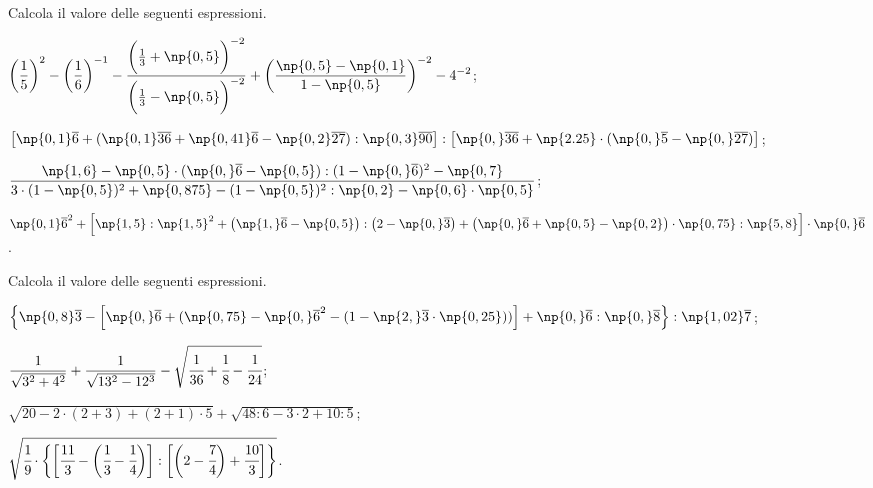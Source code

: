 \begin{esercizio}[\Ast]
 Calcola il valore delle seguenti espressioni.
\begin{enumeratea}
\spazielenx
\item $\displaystyle{\bigg(\frac{1}{5}\bigg)^{2}-\bigg(\frac{1}{6}\bigg)^{-1}-\frac{\bigg(\frac{1}{3}+\np{0,5}\bigg)^{-2}}%
{\bigg(\frac{1}{3}-\np{0,5}\bigg)^{-2}}+\bigg(\frac{\np{0,5}-\np{0,1}}{1-\np{0,5}}\bigg)^{-2}-4^{-2}}$;
\item $\displaystyle{\left[\np{0,1}\overline{6}+(\np{0,1}\overline{36}+\np{0,41}\overline{6}-\np{0,2}\overline{27}):\np{0,3}\overline{90}\right]:%
\left[\np{0,}\overline{36}+\np{2.25}\cdot(\np{0,}\overline{5}-\np{0,}\overline{27})\right]}$;
\item $\displaystyle{\frac{\np{1,6}-\np{0,5}\cdot(\np{0,}\overline{6}-\np{0,5}):(1-\np{0,}\overline{6})^{2}-\np{0,7}}%
{3\cdot(1-\np{0,5})^{2}+\np{0,875}-(1-\np{0,5})^{2}:\np{0,2}-\np{0,6}\cdot\np{0,5}}}$;
\item $\displaystyle{{\np{0,1}\overline{{6}}}^{2}+\left[\np{1,5}:\np{1,5}^{2}+\left(\np{1,}\overline{6}-\np{0,5}\right):\left(2-\np{0,}\overline{3}\right)%
+\left(\np{0,}\overline{{6}}+\np{0,5}-\np{0,2}\right)\cdot\np{0,75}:\np{5,8}\right]\cdot \np{0,}\overline{{6}}}$.
\end{enumeratea}
\end{esercizio}

\begin{esercizio}[\Ast]
 Calcola il valore delle seguenti espressioni.
\begin{enumeratea}
\spazielenx
\item $\displaystyle{\left\{\np{0,8}\overline{3}-\left[\np{0,}\overline{6}+(\np{0,75}-{\np{0,}\overline{6}}^{2}-(1-\np{2,}\overline{3}\cdot%
\np{0,25}))\right]+\np{0,}\overline{6}:\np{0,}\overline{8}\right\}:\np{1,02}\overline{7}}$;
\item $\displaystyle{\frac{1}{\sqrt{3^{2}+4^{2}}}+\frac{1}{\sqrt{13^{2}-12^3}}-\sqrt{\cfrac{1}{36}+\cfrac{1}{8}%
-\cfrac{1}{24}}}$;
\item $\displaystyle{\sqrt{20-2\cdot(2+3)+(2+1)\cdot5}+\sqrt{48:6-3\cdot2+10:5}}$;
\item $\displaystyle{\sqrt{\cfrac{1}{9}\cdot\bigg\{\bigg[\cfrac{11}{3}-\bigg(\cfrac{1}{3}-\cfrac{1}{4}\bigg)\bigg]:%
\bigg[\bigg(2-\cfrac{7}{4}\bigg)+\cfrac{10}{3}\bigg]\bigg\}}}$.
\end{enumeratea}
\end{esercizio}

